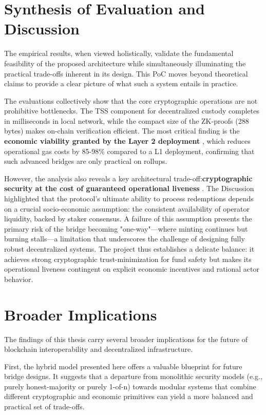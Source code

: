 \documentclass{DESSThesis}
\begin{document}
\section{Synthesis of Evaluation and Discussion}

The empirical results, when viewed holistically, validate the fundamental feasibility of the proposed architecture while simultaneously illuminating the practical trade-offs inherent in its design. This PoC moves beyond theoretical claims to provide a clear picture of what such a system entails in practice.

The evaluations collectively show that the core cryptographic operations are not prohibitive bottlenecks. The TSS component for decentralized custody completes in milliseconds in local network, while the compact size of the ZK-proofs (288 bytes) makes on-chain verification efficient. The most critical finding is the \textbf{economic viability granted by the Layer 2 deployment} , which reduces operational gas costs by 85-98\% compared to a L1 deployment, confirming that such advanced bridges are only practical on rollups.

However, the analysis also reveals a key architectural trade-off:\textbf{cryptographic security at the cost of guaranteed operational liveness} . The Discussion highlighted that the protocol's ultimate ability to process redemptions depends on a crucial socio-economic assumption: the consistent availability of operator liquidity, backed by staker consensus. A failure of this assumption presents the primary risk of the bridge becoming "one-way"—where minting continues but burning stalls—a limitation that underscores the challenge of designing fully robust decentralized systems. The project thus establishes a delicate balance: it achieves strong cryptographic trust-minimization for fund safety but makes its operational liveness contingent on explicit economic incentives and rational actor behavior.

\section{Broader Implications}

The findings of this thesis carry several broader implications for the future of blockchain interoperability and decentralized infrastructure.

First, the hybrid model presented here offers a valuable blueprint for future bridge designs. It suggests that a departure from monolithic security models (e.g., purely honest-majority or purely 1-of-n) towards modular systems that combine different cryptographic and economic primitives can yield a more balanced and practical set of trade-offs.
\end{document}
